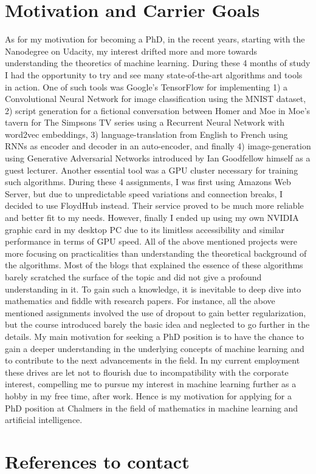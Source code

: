 \documentclass[12pt]{article}
\begin{document}
\section*{Motivation and Carrier Goals}
As for my motivation for becoming a PhD, in the recent years, starting with the Nanodegree on Udacity, my interest drifted more and more towards understanding the theoretics of machine learning. During these 4 months of study I had the opportunity to try and see many state-of-the-art algorithms and tools in action. One of such tools was Google's TensorFlow for implementing 1) a Convolutional Neural Network for image classification using the MNIST dataset, 2) script generation for a fictional conversation between Homer and Moe in Moe's tavern for The Simpsons TV series using a Recurrent Neural Network with word2vec embeddings, 3) language-translation from English to French using RNNs as encoder and decoder in an auto-encoder, and finally 4) image-generation using Generative Adversarial Networks introduced by Ian Goodfellow himself as a guest lecturer.
Another essential tool was a GPU cluster necessary for training such algorithms. During these 4 assignments, I was first using Amazons Web Server, but due to unpredictable speed variations and connection breaks, I decided to use FloydHub instead. Their service proved to be much more reliable and better fit to my needs. However, finally I ended up using my own NVIDIA graphic card in my desktop PC due to its limitless accessibility and similar performance in terms of GPU speed.
All of the above mentioned projects were more focusing on practicalities than understanding the theoretical background of the algorithms. Most of the blogs that explained the essence of these algorithms barely scratched the surface of the topic and did not give a profound understanding in it. To gain such a knowledge, it is inevitable to deep dive into mathematics and fiddle with research papers. For instance, all the above mentioned assignments involved the use of dropout to gain better regularization, but the course introduced barely the basic idea and neglected to go further in the details. My main motivation for seeking a PhD position is to have the chance to gain a deeper understanding in the underlying concepts of machine learning and to contribute to the next advancements in the field. In my current employment these drives are let not to flourish due to incompatibility with the corporate interest, compelling me to pursue my interest in machine learning further as a hobby in my free time, after work. Hence is my motivation for applying for a PhD position at Chalmers in the field of mathematics in machine learning and artificial intelligence.

\section*{References to contact}



\end{document}
